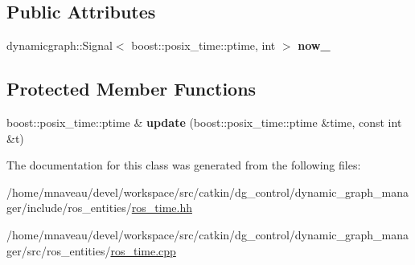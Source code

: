 \subsection*{Public Attributes}
\begin{DoxyCompactItemize}
\item 
dynamicgraph\+::\+Signal$<$ boost\+::posix\+\_\+time\+::ptime, int $>$ {\bfseries now\+\_\+}\hypertarget{classdynamic__graph_1_1RosTime_ac928e12f6defd2dbda5827010fa073b7}{}\label{classdynamic__graph_1_1RosTime_ac928e12f6defd2dbda5827010fa073b7}

\end{DoxyCompactItemize}
\subsection*{Protected Member Functions}
\begin{DoxyCompactItemize}
\item 
boost\+::posix\+\_\+time\+::ptime \& {\bfseries update} (boost\+::posix\+\_\+time\+::ptime \&time, const int \&t)\hypertarget{classdynamic__graph_1_1RosTime_a29444845a864140359ec5c77169f638d}{}\label{classdynamic__graph_1_1RosTime_a29444845a864140359ec5c77169f638d}

\end{DoxyCompactItemize}


The documentation for this class was generated from the following files\+:\begin{DoxyCompactItemize}
\item 
/home/mnaveau/devel/workspace/src/catkin/dg\+\_\+control/dynamic\+\_\+graph\+\_\+manager/include/ros\+\_\+entities/\hyperlink{ros__time_8hh}{ros\+\_\+time.\+hh}\item 
/home/mnaveau/devel/workspace/src/catkin/dg\+\_\+control/dynamic\+\_\+graph\+\_\+manager/src/ros\+\_\+entities/\hyperlink{ros__time_8cpp}{ros\+\_\+time.\+cpp}\end{DoxyCompactItemize}
